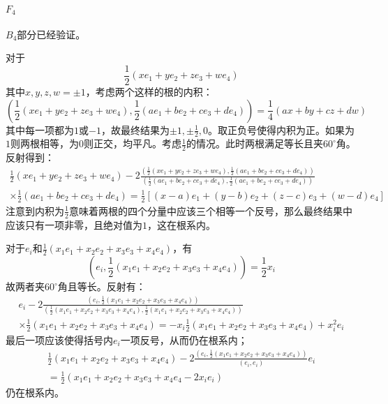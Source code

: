 \documentclass{ctexart}
\begin{document}
	\paragraph{$F_4$}
	
	$B_4$部分已经验证。
	
	对于
	\begin{equation}
	\frac{1}{2}(xe_1+ye_2+ze_3+we_4)
	\end{equation}
	其中$x,y,z,w=\pm 1$，考虑两个这样的根的内积：
	\begin{equation}
	\left(\frac{1}{2}(xe_1+ye_2+ze_3+we_4),\frac{1}{2}(ae_1+be_2+ce_3+de_4)\right)=\frac{1}{4}(ax+by+cz+dw)
	\end{equation}
	其中每一项都为$1$或$-1$，故最终结果为$\pm 1,\pm \frac{1}{2},0$。取正负号使得内积为正。如果为$1$则两根相等，为$0$则正交，均平凡。考虑$\frac{1}{2}$的情况。此时两根满足等长且夹$60^\circ$角。反射得到：
	\begin{multline}
	\frac{1}{2}(xe_1+ye_2+ze_3+we_4)-2\frac{\left(\frac{1}{2}(xe_1+ye_2+ze_3+we_4),\frac{1}{2}(ae_1+be_2+ce_3+de_4)\right)}{\left(\frac{1}{2}(ae_1+be_2+ce_3+de_4),\frac{1}{2}(ae_1+be_2+ce_3+de_4)\right)}\\\times\frac{1}{2}(ae_1+be_2+ce_3+de_4)=\frac{1}{2}[(x-a)e_1+(y-b)e_2+(z-c)e_3+(w-d)e_4]
	\end{multline}
	注意到内积为$\frac{1}{2}$意味着两根的四个分量中应该三个相等一个反号，那么最终结果中应该只有一项非零，且绝对值为$1$，这在根系内。
	
	对于$e_i$和$\frac{1}{2}(x_1e_1+x_2e_2+x_3e_3+x_4e_4)$，有
	\begin{equation}
	\left(e_i,\frac{1}{2}(x_1e_1+x_2e_2+x_3e_3+x_4e_4)\right)=\frac{1}{2}x_i
	\end{equation}
	故两者夹$60^\circ$角且等长。反射有：
	\begin{multline}
	e_i-2\frac{\left(e_i,\frac{1}{2}(x_1e_1+x_2e_2+x_3e_3+x_4e_4)\right)}{\left(\frac{1}{2}(x_1e_1+x_2e_2+x_3e_3+x_4e_4),\frac{1}{2}(x_1e_1+x_2e_2+x_3e_3+x_4e_4)\right)}\\\times\frac{1}{2}(x_1e_1+x_2e_2+x_3e_3+x_4e_4)=-x_i\frac{1}{2}(x_1e_1+x_2e_2+x_3e_3+x_4e_4)+x_i^2e_i
	\end{multline}
	最后一项应该使得括号内$e_i$一项反号，从而仍在根系内；
	\begin{multline}
	\frac{1}{2}(x_1e_1+x_2e_2+x_3e_3+x_4e_4)-2\frac{\left(e_i,\frac{1}{2}(x_1e_1+x_2e_2+x_3e_3+x_4e_4)\right)}{(e_i,e_i)}e_i\\=\frac{1}{2}(x_1e_1+x_2e_2+x_3e_3+x_4e_4-2x_ie_i)
	\end{multline}
	仍在根系内。
	
\end{document}
